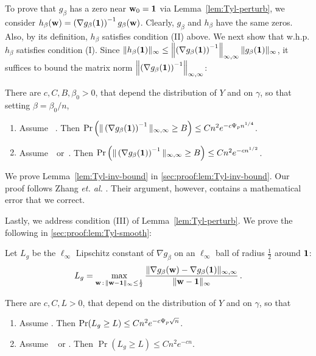 \documentclass[times,sort&compress,3p]{elsarticle}
\begin{document}
To prove that $g_\beta$ has a zero near ${\bf w}_0=\bm{1}$ via Lemma~\ref{lem:Tyl-perturb}, we consider
$h_\beta({\bf w})=\left(\nabla g_\beta({\bf 1})\right)^{-1} g_\beta({\bf w})$. Clearly, $g_\beta$ and $h_\beta$ have the same zeros. Also, by its definition, $h_\beta$ satisfies condition (II) above. 
We next show that w.h.p. $h_\beta$ satisfies condition (I). Since $\|h_\beta(\bm{1})\|_\infty \le \left\|\left(\nabla g_\beta({\bf 1})\right)^{-1}\right\|_{\infty,\infty}\|g_\beta({\bf 1})\|_\infty$, 
it suffices to bound the matrix norm $\left\|\left(\nabla g_\beta({\bf 1})\right)^{-1}\right\|_{\infty,\infty}$:
\begin{lemma}\label{lem:Tyl-inv-bound}
        There are $c,C,B,\beta_0>0$, that depend the distribution of $Y$ and on $\gamma$, so that setting $\beta=\beta_0/n$,
        \begin{enumerate}
             \item Assume ~\AssumLC. Then $\Pr\left( \|\left(\nabla g_\beta({\bf 1})\right)^{-1}\|_{\infty,\infty} \ge B \right) \le Cn^2 e^{-c\Psi_p n^{1/4}}$.
            \item Assume~\AssumIndep~or~\AssumCCPSB. Then $\Pr\left( \|\left(\nabla g_\beta({\bf 1})\right)^{-1}\|_{\infty,\infty} \ge B \right) \le Cn^2 e^{-cn^{1/2}}$.
        \end{enumerate}
\end{lemma}
We prove Lemma~\ref{lem:Tyl-inv-bound} in 
\ref{sec:proof:lem:Tyl-inv-bound}.
Our proof follows 
Zhang {\it et. al.} \cite[Lemma 3.3]{zhang2016marvcenko}. Their argument, however, contains a mathematical error that we correct. 
%

Lastly, we address condition (III) of Lemma~\ref{lem:Tyl-perturb}. We prove 
the following in
\ref{sec:proof:lem:Tyl-smooth}:
\begin{lemma}\label{lem:Tyl-smooth}
        Let $L_g$ be the $\ell_\infty$ Lipschitz constant of $\nabla g_\beta$ on an $\ell_\infty$ ball of radius $\frac12$ around ${\bf 1}$:
        \[
        L_g = \max_{{\bf w}\,:\,\|{\bf w}-{\bf 1}\|_\infty\le \frac12} \frac{\|\nabla g_\beta({\bf w})-\nabla g_\beta({\bf 1})\|_{\infty,\infty}}{\|{\bf w}-{\bf 1}\|_\infty}\,.
        \]

        There are $c,C,L>0$, that depend on the distribution of $Y$ and on $\gamma$, so that
        \begin{enumerate}
            \item Assume \AssumLC. Then $\Pr(L_g\ge L) \le Cn^2e^{-c\Psi_p\sqrt{n}}$.
            \item Assume \AssumIndep~ or \AssumCCPSB. Then $\Pr(L_g\ge L) \le Cn^2e^{-cn}$.
        \end{enumerate}
\end{lemma}
\end{document}
